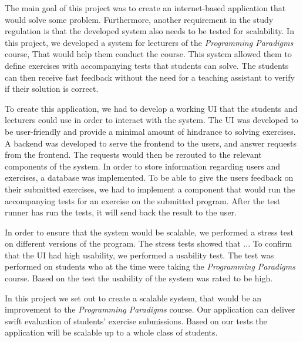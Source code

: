 The main goal of this project was to create an internet-based application that would solve some problem.
Furthermore, another requirement in the study regulation is that the developed system also needs to be tested for scalability. 
In this project, we developed a system for lecturers of the \textit{Programming Paradigms} course, That would help them conduct the course. This system allowed them to define exercises with accompanying tests that students can solve. 
The students can then receive fast feedback without the need for a teaching assistant to verify if their solution is correct. 

To create this application, we had to develop a working UI that the students and lecturers could use in order to interact with the system. The UI was developed to be user-friendly and provide a minimal amount of hindrance to solving exercises.
A backend was developed to serve the frontend to the users, and answer requests from the frontend. 
The requests would then be rerouted to the relevant components of the system. 
In order to store information regarding users and exercises, a database was implemented.
To be able to give the users feedback on their submitted exercises, we had to implement a component that would run the accompanying tests for an exercise on the submitted program. 
After the test runner has run the tests, it will send back the result to the user.

In order to ensure that the system would be scalable, we performed a stress test on different versions of the program. 
The stress tests showed that ... 
To confirm that the UI had high usability, we performed a usability test.
The test was performed on students who at the time were taking the \textit{Programming Paradigms} course.
Based on the test the usability of the system was rated to be high.  

In this project we set out to create a scalable system, that would be an improvement to the \textit{Programming Paradigms} course.
Our application can deliver swift evaluation of students' exercise submissions. Based on our tests the application will be scalable up to a whole class of students.
